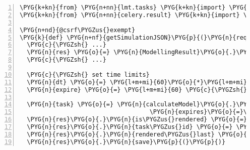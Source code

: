 \begin{Verbatim}[commandchars=\\\{\},numbers=left,stepnumber=1,codes={\catcode`\$=3\catcode`\^=7\catcode`\_=8}]
\PYG{k+kn}{from} \PYG{n+nn}{lmt.tasks} \PYG{k+kn}{import} \PYG{n}{calculateModel}
\PYG{k+kn}{from} \PYG{n+nn}{celery.result} \PYG{k+kn}{import} \PYG{n}{AsyncResult}

\PYG{n+nd}{@csrf\PYGZus{}exempt}
\PYG{k}{def} \PYG{n+nf}{getSimulationJSON}\PYG{p}{(}\PYG{n}{request}\PYG{p}{,} \PYG{n}{result\PYGZus{}id}\PYG{p}{)}\PYG{p}{:}
  \PYG{c}{\PYGZsh{} ...}
  \PYG{n}{res} \PYG{o}{=} \PYG{n}{ModellingResult}\PYG{o}{.}\PYG{n}{objects}\PYG{o}{.}\PYG{n}{get}\PYG{p}{(}\PYG{n+nb}{id}\PYG{o}{=}\PYG{n}{result\PYGZus{}id}\PYG{p}{)}
  \PYG{c}{\PYGZsh{} ...}

  \PYG{c}{\PYGZsh{} set time limits}
  \PYG{n}{dt} \PYG{o}{=} \PYG{l+m+mi}{60}\PYG{o}{*}\PYG{l+m+mi}{30} \PYG{c}{\PYGZsh{} task has 30min till it gets revoked}
  \PYG{n}{expire} \PYG{o}{=} \PYG{l+m+mi}{60} \PYG{c}{\PYGZsh{} task gets canceled after 60s in queue}
  
  \PYG{n}{task} \PYG{o}{=} \PYG{n}{calculateModel}\PYG{o}{.}\PYG{n}{apply\PYGZus{}async}\PYG{p}{(}\PYG{n}{args}\PYG{o}{=}\PYG{p}{(}\PYG{n}{result\PYGZus{}id}\PYG{p}{,}\PYG{p}{)}\PYG{p}{,} \PYG{n}{timeout}\PYG{o}{=}\PYG{n}{dt}\PYG{p}{,}
                                    \PYG{n}{expires}\PYG{o}{=}\PYG{n}{expire}\PYG{p}{)}
  \PYG{n}{res}\PYG{o}{.}\PYG{n}{is\PYGZus{}rendered} \PYG{o}{=} \PYG{n+nb+bp}{False}
  \PYG{n}{res}\PYG{o}{.}\PYG{n}{task\PYGZus{}id} \PYG{o}{=} \PYG{n}{task}\PYG{o}{.}\PYG{n}{task\PYGZus{}id}
  \PYG{n}{res}\PYG{o}{.}\PYG{n}{rendered\PYGZus{}last} \PYG{o}{=} \PYG{n}{now}\PYG{p}{(}\PYG{p}{)}\PYG{p}{;}
  \PYG{n}{res}\PYG{o}{.}\PYG{n}{save}\PYG{p}{(}\PYG{p}{)}
\end{Verbatim}
